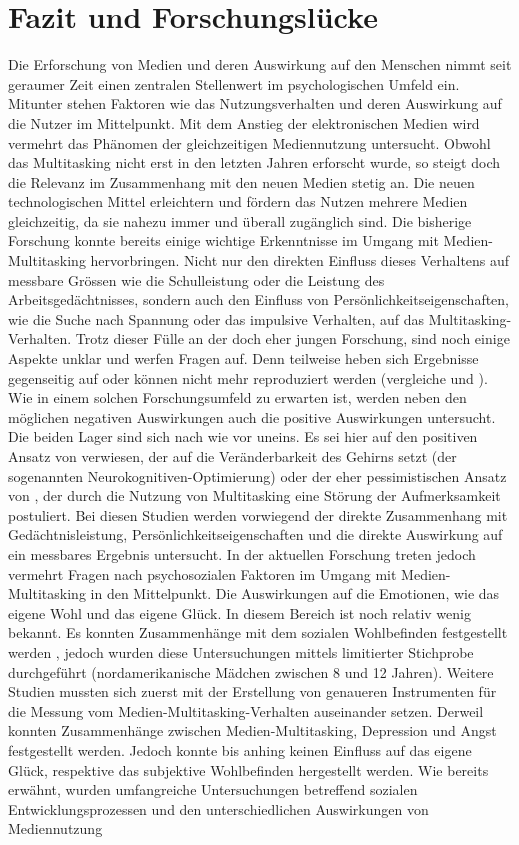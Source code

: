 \section{Fazit und Forschungslücke}\label{section.fazitLücke}
Die Erforschung von Medien und deren Auswirkung auf den Menschen nimmt seit geraumer Zeit einen zentralen Stellenwert im psychologischen Umfeld ein. Mitunter stehen Faktoren wie das Nutzungsverhalten und deren Auswirkung auf die Nutzer im Mittelpunkt. Mit dem Anstieg der elektronischen Medien wird vermehrt das Phänomen der gleichzeitigen Mediennutzung untersucht. Obwohl das Multitasking nicht erst in den letzten Jahren erforscht wurde, so steigt doch die Relevanz im Zusammenhang mit den neuen Medien stetig an. Die neuen technologischen Mittel erleichtern und fördern das Nutzen mehrere Medien gleichzeitig, da sie nahezu immer und überall zugänglich sind. Die bisherige Forschung konnte bereits einige wichtige Erkenntnisse im Umgang mit Medien-Multitasking hervorbringen. Nicht nur den direkten Einfluss dieses Verhaltens auf messbare Grössen wie die Schulleistung oder die Leistung des Arbeitsgedächtnisses, sondern auch den Einfluss von Persönlichkeitseigenschaften, wie die Suche nach Spannung oder das impulsive Verhalten, auf das Multitasking-Verhalten. Trotz dieser Fülle an der doch eher jungen Forschung, sind noch einige Aspekte unklar und werfen Fragen auf. Denn teilweise heben sich Ergebnisse gegenseitig auf oder können nicht mehr reproduziert werden (vergleiche  und ). Wie in einem solchen Forschungsumfeld zu erwarten ist, werden neben den möglichen negativen Auswirkungen auch die positive Auswirkungen untersucht. Die beiden Lager sind sich nach wie vor uneins. Es sei hier auf den positiven Ansatz von  verwiesen, der auf die Veränderbarkeit des Gehirns setzt (der sogenannten Neurokognitiven-Optimierung) oder der eher pessimistischen Ansatz von , der durch die Nutzung von Multitasking eine Störung der Aufmerksamkeit postuliert. Bei diesen Studien werden vorwiegend der direkte Zusammenhang mit Gedächtnisleistung, Persönlichkeitseigenschaften und die direkte Auswirkung auf ein messbares Ergebnis untersucht. In der aktuellen Forschung treten jedoch vermehrt Fragen nach psychosozialen Faktoren im Umgang mit Medien-Multitasking in den Mittelpunkt. Die Auswirkungen auf die Emotionen, wie das eigene Wohl und das eigene Glück. In diesem Bereich ist noch relativ wenig bekannt. Es konnten Zusammenhänge mit dem sozialen Wohlbefinden festgestellt werden , jedoch wurden diese Untersuchungen mittels limitierter Stichprobe durchgeführt (nordamerikanische Mädchen zwischen 8 und 12 Jahren). Weitere Studien mussten sich zuerst mit der Erstellung von genaueren Instrumenten für die Messung vom Medien-Multitasking-Verhalten auseinander setzen. Derweil konnten Zusammenhänge zwischen Medien-Multitasking, Depression und Angst festgestellt werden. Jedoch konnte bis anhing keinen  Einfluss auf das eigene Glück, respektive das subjektive Wohlbefinden hergestellt werden. Wie bereits  erwähnt, wurden umfangreiche Untersuchungen betreffend sozialen Entwicklungsprozessen und den unterschiedlichen Auswirkungen von Mediennutzung 